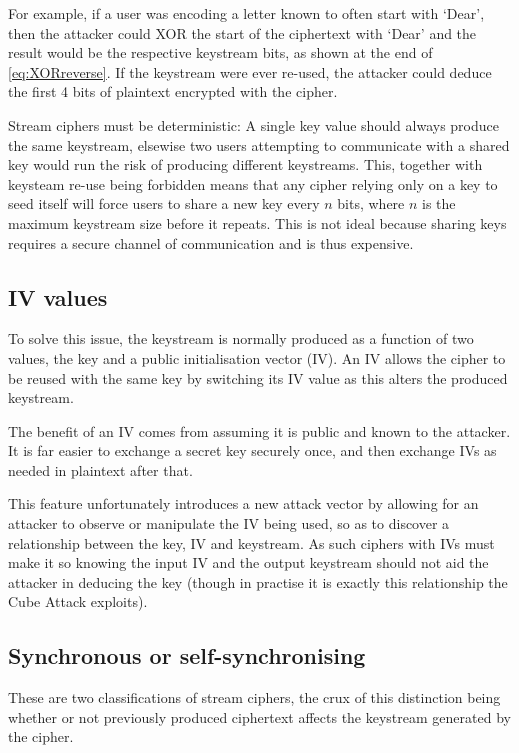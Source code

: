 \documentclass{report}
\let\Oldsubsection\subsection
\renewcommand{\subsection}{\FloatBarrier\Oldsubsection}
\begin{document}
For example, if a user was encoding a letter known to often start with `Dear', then the attacker could XOR the start of the ciphertext with `Dear' and the result would be the respective keystream bits, as shown at the end of \ref{eq:XORreverse}. If the keystream were ever re-used, the attacker could deduce the first 4 bits of plaintext encrypted with the cipher.

Stream ciphers must be deterministic: A single key value should always produce the same keystream, elsewise two users attempting to communicate with a shared key would run the risk of producing different keystreams. This, together with keysteam re-use being forbidden means that any cipher relying only on a key to seed itself will force users to share a new key every $n$ bits, where $n$ is the maximum keystream size before it repeats. This is not ideal because sharing keys requires a secure channel of communication and is thus expensive.

\subsection{IV values}
To solve this issue, the keystream is normally produced as a function of two values, the key and a public initialisation vector (IV). An IV allows the cipher to be reused with the same key by switching its IV value as this alters the produced keystream.

The benefit of an IV comes from assuming it is public and known to the attacker. It is far easier to exchange a secret key securely once, and then exchange IVs as needed in plaintext after that.

This feature unfortunately introduces a new attack vector by allowing for an attacker to observe or manipulate the IV being used, so as to discover a relationship between the key, IV and keystream. As such ciphers with IVs must make it so knowing the input IV and the output keystream should not aid the attacker in deducing the key (though in practise it is exactly this relationship the Cube Attack exploits).

\subsection{Synchronous or self-synchronising}
These are two classifications of stream ciphers, the crux of this distinction being whether or not previously produced ciphertext affects the keystream generated by the cipher\cite{selfSyncCipher}.
\end{document}
